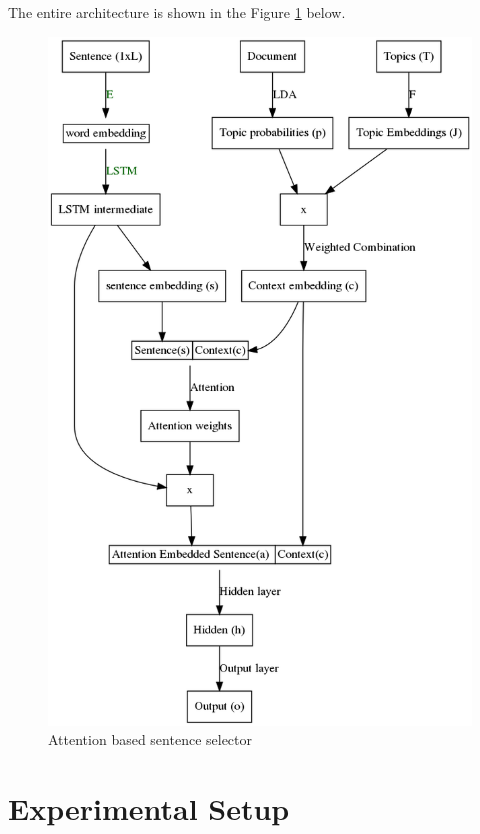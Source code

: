 The entire architecture is shown in the Figure \ref{fig1} below.
\begin{figure}
\includegraphics[scale=0.25]{graph1.png}
\caption{Attention based sentence selector}	
\label{fig1}
\end{figure}

\vspace{-2mm}
\section{Experimental Setup}

